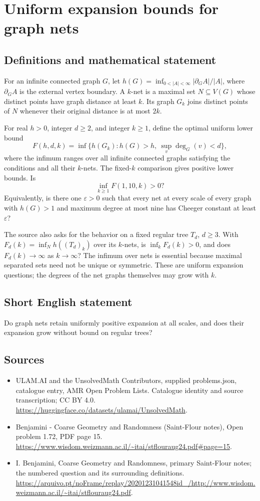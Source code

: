\documentclass[11pt,a4paper]{article}
\begin{document}
\section*{Uniform expansion bounds for graph nets}\label{statement}

\subsection{Definitions and mathematical statement}
For an infinite connected graph $G$, let $h(G)=\inf_{0<|A|<\infty}|\partial_G A|/|A|$, where $\partial_G A$ is the external vertex boundary. A $k$-net is a maximal set $N\subseteq V(G)$ whose distinct points have graph distance at least $k$. Its graph $G_k$ joins distinct points of $N$ whenever their original distance is at most $2k$.

For real $h>0$, integer $d\ge2$, and integer $k\ge1$, define the optimal uniform lower bound
\[
F(h,d,k)=\inf\{h(G_k):h(G)>h,\ \sup_v\deg_G(v)<d\},
\]
where the infimum ranges over all infinite connected graphs satisfying the conditions and all their $k$-nets. The fixed-$k$ comparison gives positive lower bounds. Is
\[
\inf_{k\ge1}F(1,10,k)>0?
\]
Equivalently, is there one $\varepsilon>0$ such that every net at every scale of every graph with $h(G)>1$ and maximum degree at most nine has Cheeger constant at least $\varepsilon$?

The source also asks for the behavior on a fixed regular tree $T_d$, $d\ge3$. With $F_d(k)=\inf_N h((T_d)_k)$ over its $k$-nets, is $\inf_kF_d(k)>0$, and does $F_d(k)\to\infty$ as $k\to\infty$? The infimum over nets is essential because maximal separated sets need not be unique or symmetric. These are uniform expansion questions; the degrees of the net graphs themselves may grow with $k$.
\subsection{Short English statement}
Do graph nets retain uniformly positive expansion at all scales, and does their expansion grow without bound on regular trees?
\subsection{Sources}
\begin{itemize}
\item[S1] ULAM.AI and the UnsolvedMath Contributors, supplied problems.json, catalogue entry, AMR Open Problem Lists. Catalogue identity and source transcription; CC BY 4.0.
\url{https://huggingface.co/datasets/ulamai/UnsolvedMath}.
\item[S2] Benjamini - Coarse Geometry and Randomness (Saint-Flour notes), Open problem 1.72, PDF page 15. 
\url{https://www.wisdom.weizmann.ac.il/~itai/stflouraug24.pdf#page=15}.
\item[S3] I. Benjamini, Coarse Geometry and Randomness, primary Saint-Flour notes; the numbered question and its surrounding definitions.
\url{https://arquivo.pt/noFrame/replay/20201231041548id_/http://www.wisdom.weizmann.ac.il/~itai/stflouraug24.pdf}.
\end{itemize}
\end{document}
